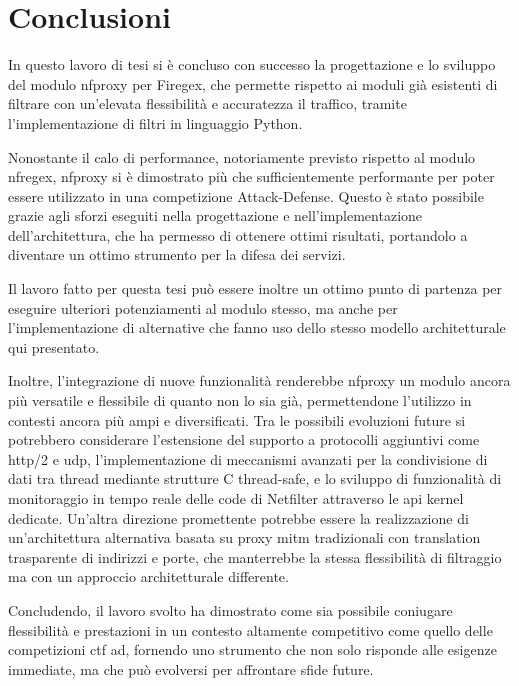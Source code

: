 \chapter*{Conclusioni}\label{chap:ending}

In questo lavoro di tesi si è concluso con successo la progettazione e lo sviluppo del modulo \gls{nfproxy} per Firegex, che permette rispetto ai moduli già esistenti di filtrare con un'elevata flessibilità e accuratezza il traffico, tramite l'implementazione di filtri in linguaggio Python.

Nonostante il calo di performance, notoriamente previsto rispetto al modulo \gls{nfregex}, \gls{nfproxy} si è dimostrato più che sufficientemente performante per poter essere utilizzato in una competizione Attack-Defense. Questo è stato possibile grazie agli sforzi eseguiti nella progettazione e nell'implementazione dell'architettura, che ha permesso di ottenere ottimi risultati, portandolo a diventare un ottimo strumento per la difesa dei servizi.

Il lavoro fatto per questa tesi può essere inoltre un ottimo punto di partenza per eseguire ulteriori potenziamenti al modulo stesso, ma anche per l'implementazione di alternative che fanno uso dello stesso modello architetturale qui presentato.

Inoltre, l'integrazione di nuove funzionalità renderebbe \gls{nfproxy} un modulo ancora più versatile e flessibile di quanto non lo sia già, permettendone l'utilizzo in contesti ancora più ampi e diversificati. Tra le possibili evoluzioni future si potrebbero considerare l'estensione del supporto a protocolli aggiuntivi come \gls{http}/2 e \gls{udp}, l'implementazione di meccanismi avanzati per la condivisione di dati tra thread mediante strutture C thread-safe, e lo sviluppo di funzionalità di monitoraggio in tempo reale delle code di Netfilter attraverso le \gls{api} kernel dedicate. Un'altra direzione promettente potrebbe essere la realizzazione di un'architettura alternativa basata su proxy \gls{mitm} tradizionali con translation trasparente di indirizzi e porte, che manterrebbe la stessa flessibilità di filtraggio ma con un approccio architetturale differente.

Concludendo, il lavoro svolto ha dimostrato come sia possibile coniugare flessibilità e prestazioni in un contesto altamente competitivo come quello delle competizioni \gls{ctf} \gls{ad}, fornendo uno strumento che non solo risponde alle esigenze immediate, ma che può evolversi per affrontare sfide future.

